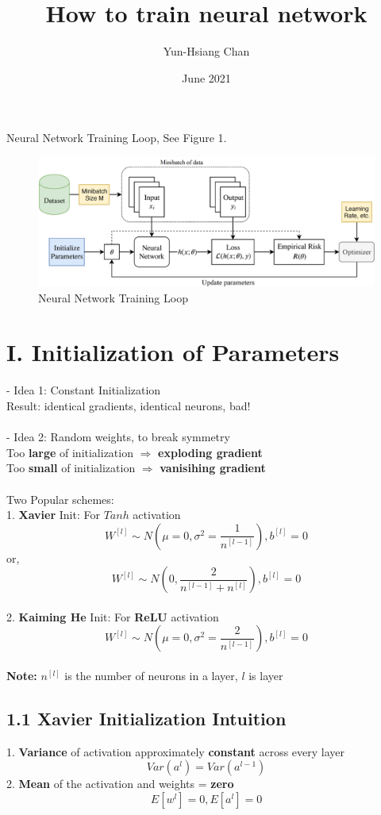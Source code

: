 \documentclass{article}
\title{How to train neural network}
\author{Yun-Hsiang Chan}
\date{June 2021}
\begin{document}
\maketitle

Neural Network Training Loop, See Figure 1.

\begin{figure}
    \includegraphics[width = 15cm]{Tut03_TrainDiag.png}
    \caption{Neural Network Training Loop}
\end{figure}

\section*{I. Initialization of Parameters} 
- Idea 1: Constant Initialization \\
Result: identical gradients, identical neurons, bad! \\
\\
- Idea 2: Random weights, to break symmetry \\
Too \textbf{large} of initialization $\Rightarrow$ \textbf{exploding gradient} \\
Too \textbf{small} of initialization $\Rightarrow$ \textbf{vanisihing gradient} \\
\\
Two Popular schemes: \\
1. \textbf{Xavier} Init: For $Tanh$ activation \\
$$W^{[l]} \sim N(\mu = 0, \sigma^2 = \frac{1}{n^{[l-1]}}), b^{[l]} = 0$$
or, 
$$W^{[l]} \sim N(0, \frac{2}{n^{[l-1]} + n^{[l]}}), b^{[l]} = 0$$
\\
2. \textbf{Kaiming He} Init: For \textbf{ReLU} activation \\
$$W^{[l]} \sim N(\mu = 0, \sigma^2 = \frac{2}{n^{[l-1]}}), b^{[l]} = 0$$
\\
\textbf{Note:} $n^{[l]}$ is the number of neurons in a layer, $l$ is layer

\subsection*{1.1 Xavier Initialization Intuition}
1. \textbf{Variance} of activation approximately \textbf{constant} across every layer
$$Var(a^l) = Var(a^{l-1})$$
2. \textbf{Mean} of the activation and weights = \textbf{zero}
$$E[w^l] = 0, E[a^l] = 0$$
\end{document}

